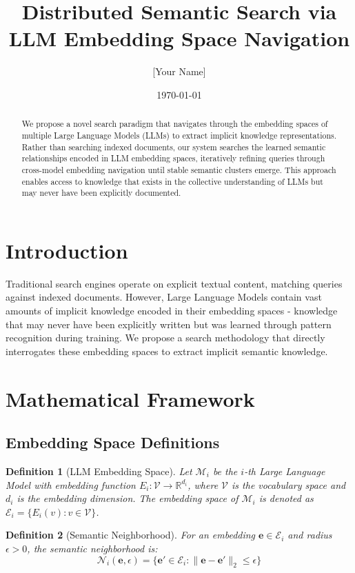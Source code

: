 \documentclass{article}
\title{Distributed Semantic Search via LLM Embedding Space Navigation}
\author{[Your Name]}
\date{\today}
\newtheorem{definition}{Definition}
\begin{document}
\maketitle

\begin{abstract}
We propose a novel search paradigm that navigates through the embedding spaces of multiple Large Language Models (LLMs) to extract implicit knowledge representations. Rather than searching indexed documents, our system searches the learned semantic relationships encoded in LLM embedding spaces, iteratively refining queries through cross-model embedding navigation until stable semantic clusters emerge. This approach enables access to knowledge that exists in the collective understanding of LLMs but may never have been explicitly documented.
\end{abstract}

\section{Introduction}

Traditional search engines operate on explicit textual content, matching queries against indexed documents. However, Large Language Models contain vast amounts of implicit knowledge encoded in their embedding spaces - knowledge that may never have been explicitly written but was learned through pattern recognition during training. We propose a search methodology that directly interrogates these embedding spaces to extract implicit semantic knowledge.

\section{Mathematical Framework}

\subsection{Embedding Space Definitions}

\begin{definition}[LLM Embedding Space]
Let $\mathcal{M}_i$ be the $i$-th Large Language Model with embedding function $E_i: \mathcal{V} \rightarrow \mathbb{R}^{d_i}$, where $\mathcal{V}$ is the vocabulary space and $d_i$ is the embedding dimension. The embedding space of $\mathcal{M}_i$ is denoted as $\mathcal{E}_i = \{E_i(v) : v \in \mathcal{V}\}$.
\end{definition}

\begin{definition}[Semantic Neighborhood]
For an embedding $\mathbf{e} \in \mathcal{E}_i$ and radius $\epsilon > 0$, the semantic neighborhood is:
$$\mathcal{N}_i(\mathbf{e}, \epsilon) = \{\mathbf{e}' \in \mathcal{E}_i : \|\mathbf{e} - \mathbf{e}'\|_2 \leq \epsilon\}$$
\end{definition}
\end{document}
